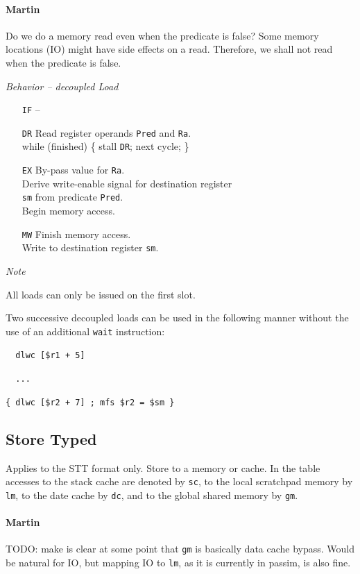 \documentclass{IEEEtran}
\newcommand{\code}[1]{{\texttt{#1}}}
\newcommand{\comment}[3]{\paragraph*{\textbf{#1}}{\color{#3}#2}}
\newcommand{\martin}[1]{\comment{Martin}{#1}{Blue}}
\newcommand{\NOT}{\texttildelow}
\begin{document}
\martin{Do we do a memory read even when the predicate is false?
Some memory locations (IO) might have side effects on a read.
Therefore, we shall not read when the predicate is false.}

\vspace{7mm}
\emph{Behavior -- decoupled Load}
\begin{itemize}
  \item[\texttt{IF}] --
  \item[\texttt{DR}] Read register operands \texttt{Pred} and \texttt{Ra}. \\
                     while (\NOT finished) \{ stall \texttt{DR}; next cycle; \}
  \item[\texttt{EX}] By-pass value for \texttt{Ra}. \\
                     Derive write-enable signal for destination register \\
                     \texttt{sm} from predicate \texttt{Pred}. \\
                     Begin memory access.
  \item[\texttt{MW}] Finish memory access. \\
                     Write to destination register \texttt{sm}.
\end{itemize}

\vspace{7mm}
\emph{Note}

All loads can only be issued on the first slot.

Two successive decoupled loads can be used in the following manner without the
use of an additional \texttt{wait} instruction:

\texttt{~~dlwc   [\$r1 + 5]}

\texttt{~~...}

\texttt{\{ dlwc   [\$r2 + 7]   ;   mfs  \$r2 = \$sm \}}


\vspace{5mm}
\subsection{Store Typed} Applies to the STT format only. Store to a memory or
cache. In the table accesses to the stack cache are denoted by \texttt{sc}, to
the local scratchpad memory by \texttt{lm}, to the date cache by \texttt{dc},
and to the global shared memory by \texttt{gm}.

\martin{TODO: make is clear at some point that \code{gm} is basically
data cache bypass. Would be natural for IO, but mapping IO to \code{lm},
as it is currently in passim, is also fine.}
\end{document}

